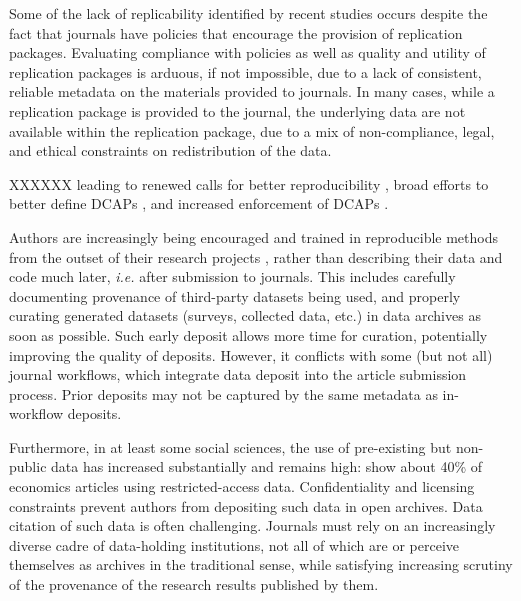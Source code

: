 Some of the lack of replicability identified by recent studies \parencite{Hoeffler2017a,Chang2017,ChangLi2015,CamererScience2016,StoddenPNAS2018}  occurs despite the fact that journals have  policies that encourage the provision of replication packages. Evaluating compliance with policies as well as quality and utility of replication packages is arduous, if not impossible, due to a lack of consistent, reliable metadata on the materials provided to journals. In many cases, while a replication package is provided to the journal, the underlying data are not available within the replication package, due to a mix of non-compliance, legal, and ethical constraints on redistribution of the data. 

XXXXXX leading to renewed calls for better reproducibility \parencite{stodden_enhancing_2016}, broad efforts to better define \acp{DCAP} \parencite{CenterforOpenScience2016,HrynaszkiewiczInt.J.Digit.Curation2017}, and increased enforcement of \acp{DCAP} \parencite{JacobyInsideHigherEd2017,10.1257/pandp.108.745,VilhuberAEAPap.Proc.2019}.

Authors are increasingly being encouraged and trained in reproducible methods from the outset of their research projects \citep{WilsonArXiv160900037Cs2016,Christensen2019a}, rather than describing their data and code much later, \textit{i.e.} after submission to journals. This includes carefully documenting provenance of third-party datasets being used, and properly curating generated datasets (surveys, collected data, etc.) in data archives as soon as possible. Such early deposit allows more time for curation, potentially improving the quality of deposits. However, it conflicts with some (but not all) journal workflows, which integrate data deposit into the article submission process. Prior deposits may not be captured by the same metadata as in-workflow deposits.

Furthermore, in at least some social sciences, the use of pre-existing but non-public data has increased substantially \parencite{Chetty2012} and remains high: \cite{Kingi2018} show about 40\% of economics articles using restricted-access data.  Confidentiality and licensing constraints prevent authors from depositing such data in open archives. Data citation \parencite{DataCitationSynthesisGroup2014} of such data is often challenging. Journals must rely on an increasingly diverse cadre of data-holding institutions, not all of which are or perceive themselves as archives in the traditional sense, while satisfying increasing scrutiny of the provenance of the research results published by them. 

